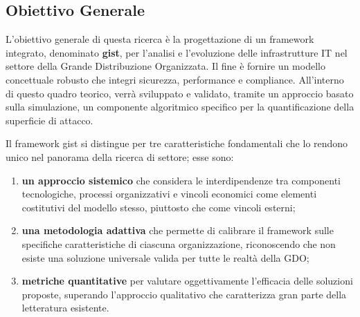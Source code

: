 \subsection{\texorpdfstring{\textbf{Obiettivo Generale}}{1.3.1 - Obiettivo Generale}}

\label{ssec:obiettivo_generale}
L'obiettivo generale di questa ricerca è la progettazione di un framework integrato, denominato \textbf{\gls{gist}}, per l'analisi e l'evoluzione delle infrastrutture IT nel settore della Grande Distribuzione Organizzata. Il fine è fornire un modello concettuale robusto che integri sicurezza, performance e compliance. All'interno di questo quadro teorico, verrà sviluppato e validato, tramite un approccio basato sulla simulazione, un componente algoritmico specifico per la quantificazione della superficie di attacco.

Il framework \gls{gist} si distingue per tre caratteristiche fondamentali che lo rendono unico nel panorama della ricerca di settore; esse sono: 
\begin{enumerate}
    \item  \textbf{un approccio sistemico} che considera le interdipendenze tra componenti tecnologiche, processi organizzativi e vincoli economici come elementi costitutivi del modello stesso, piuttosto che come vincoli esterni;
    \item \textbf{una metodologia adattiva} che permette di calibrare il framework sulle specifiche caratteristiche di ciascuna organizzazione, riconoscendo che non esiste una soluzione universale valida per tutte le realtà della GDO; 
    \item \textbf{metriche quantitative} per valutare oggettivamente l'efficacia delle soluzioni proposte, superando l'approccio qualitativo che caratterizza gran parte della letteratura esistente.
\end{enumerate}


